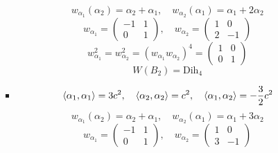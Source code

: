 \documentclass[12pt]{article}
\theoremstyle{definition}
\begin{document}
\begin{enumerate}
\begin{itemize}
\begin{itemize}
\begin{equation}
            \end{equation}
            \begin{equation}
                w_{\alpha_1}(\alpha_2)=\alpha_2+\alpha_1,\quad w_{\alpha_2}(\alpha_1)=\alpha_1+2\alpha_2
            \end{equation}
            \begin{equation}
                w_{\alpha_1}=\begin{pmatrix}
                    -1 & 1\\
                    0 & 1
                \end{pmatrix},\quad w_{\alpha_2}=\begin{pmatrix}
                    1 & 0\\
                    2 & -1
                \end{pmatrix}
            \end{equation}
            \begin{equation}
                w^2_{\alpha_1}=w^2_{\alpha_2}=(w_{\alpha_1}w_{\alpha_2})^4=\begin{pmatrix}
                    1 & 0\\
                    0 & 1
                \end{pmatrix}
            \end{equation}
            \begin{equation}
                \boxed{W(B_2)=\text{Dih}_4}
            \end{equation}
            \item 
            \begin{equation}
                \braket{\alpha_1,\alpha_1}=3c^2,\quad\braket{\alpha_2,\alpha_2}=c^2,\quad\braket{\alpha_1,\alpha_2}=-\frac{3}{2}c^2
            \end{equation}
            \begin{equation}
                w_{\alpha_1}(\alpha_2)=\alpha_2+\alpha_1,\quad w_{\alpha_2}(\alpha_1)=\alpha_1+3\alpha_2
            \end{equation}
            \begin{equation}
                w_{\alpha_1}=\begin{pmatrix}
                    -1 & 1\\
                    0 & 1
                \end{pmatrix},\quad w_{\alpha_2}=\begin{pmatrix}
                    1 & 0\\
                    3 & -1

\end{pmatrix}
\end{equation}
\end{itemize}
\end{itemize}
\end{enumerate}
\end{document}
